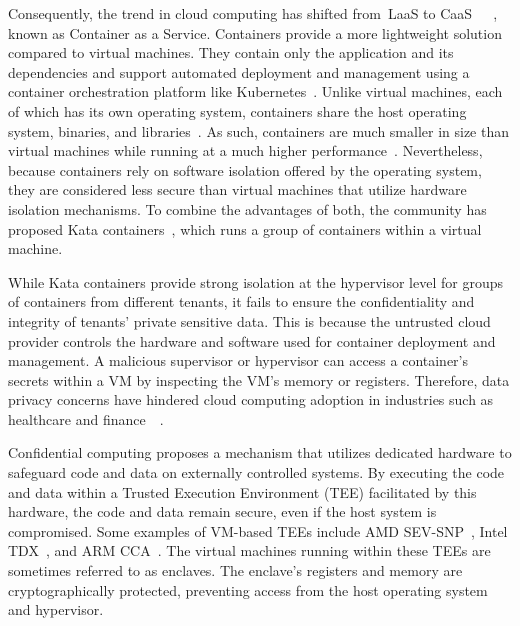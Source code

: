 Consequently, the trend in cloud computing has shifted from~\acrshort{LaaS} to CaaS~\cite*{Azure_container}~\cite*{Amazon_container}~\cite*{google_container}, known as Container as a Service. Containers provide a more lightweight solution compared to virtual machines. They contain only the application and its dependencies and support automated deployment and management using a 
container orchestration platform like Kubernetes~\cite*{k8s}. Unlike virtual machines, each of which has its own operating system, containers share the host operating system, binaries, and libraries~\cite*{container_vs_vm}. As such, containers are much smaller in size than virtual machines while running at a much higher performance~\cite*{Shirinbab2020PerformanceEO}. 
Nevertheless, because containers rely on software isolation offered by the operating system, they are considered less secure than virtual machines that utilize hardware isolation mechanisms. To combine the advantages of both, the community has proposed Kata containers~\cite*{Kata-Containers}, which 
runs a group of containers within a virtual machine.
 
While Kata containers provide strong isolation at the hypervisor level for groups of containers from different tenants, it fails to ensure the confidentiality and integrity of tenants' private sensitive data. This is because the untrusted cloud provider controls the hardware and software used for 
container deployment and management. A malicious supervisor or hypervisor can access a container's secrets within a VM by inspecting the VM's memory or registers. Therefore, data privacy concerns have hindered cloud computing adoption in industries such as healthcare and finance~\cite*{data_privacy}~\cite*{eu_data_Privacy}.
 
Confidential computing proposes a mechanism that utilizes dedicated hardware to safeguard code and data on externally controlled systems. By executing the code and data within a Trusted Execution Environment (TEE) facilitated by this hardware, the code and data remain secure, even if the host system is compromised. Some examples of VM-based \acrshort{TEE}s include 
AMD SEV-SNP~\cite*{SEV_SNP_white_book}, Intel TDX~\cite*{Intel_tdx_whitepaper}, and ARM CCA~\cite*{280904}. The virtual machines running within these \acrshort{TEE}s are sometimes referred to as enclaves. The enclave's registers and memory are 
cryptographically protected, preventing access from the host operating system and hypervisor.
 
 
 
